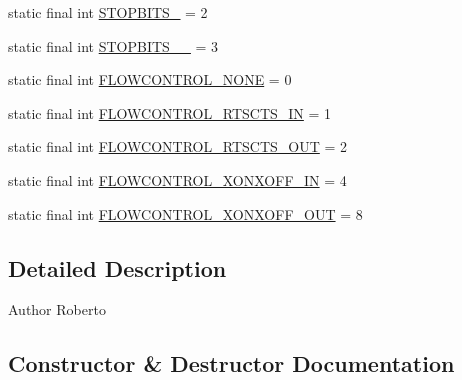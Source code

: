 \begin{DoxyCompactItemize}
\item 
static final int \hyperlink{classcom_1_1eneri_1_1scorpio__metertool_1_1ui_1_1_current_readings_records_a54572052540d5bf3f7bae7f11734f421}{S\+T\+O\+P\+B\+I\+T\+S\+\_} = 2
\item 
static final int \hyperlink{classcom_1_1eneri_1_1scorpio__metertool_1_1ui_1_1_current_readings_records_afaf278b563eae40768a7096641d89694}{S\+T\+O\+P\+B\+I\+T\+S\+\_\+\_} = 3
\item 
static final int \hyperlink{classcom_1_1eneri_1_1scorpio__metertool_1_1ui_1_1_current_readings_records_a6045158c6d6c073263331cf2dd9b59ba}{F\+L\+O\+W\+C\+O\+N\+T\+R\+O\+L\+\_\+\+N\+O\+NE} = 0
\item 
static final int \hyperlink{classcom_1_1eneri_1_1scorpio__metertool_1_1ui_1_1_current_readings_records_a67152ea3a495731f95e678b9a9addf8b}{F\+L\+O\+W\+C\+O\+N\+T\+R\+O\+L\+\_\+\+R\+T\+S\+C\+T\+S\+\_\+\+IN} = 1
\item 
static final int \hyperlink{classcom_1_1eneri_1_1scorpio__metertool_1_1ui_1_1_current_readings_records_a7e65b216afc0231edf3f66e3c17c5650}{F\+L\+O\+W\+C\+O\+N\+T\+R\+O\+L\+\_\+\+R\+T\+S\+C\+T\+S\+\_\+\+O\+UT} = 2
\item 
static final int \hyperlink{classcom_1_1eneri_1_1scorpio__metertool_1_1ui_1_1_current_readings_records_ae6668d5980371067c488de0ceae44a05}{F\+L\+O\+W\+C\+O\+N\+T\+R\+O\+L\+\_\+\+X\+O\+N\+X\+O\+F\+F\+\_\+\+IN} = 4
\item 
static final int \hyperlink{classcom_1_1eneri_1_1scorpio__metertool_1_1ui_1_1_current_readings_records_aa5171bc0cee0245bd2027d7b95b9df65}{F\+L\+O\+W\+C\+O\+N\+T\+R\+O\+L\+\_\+\+X\+O\+N\+X\+O\+F\+F\+\_\+\+O\+UT} = 8
\end{DoxyCompactItemize}


\subsection{Detailed Description}
\begin{DoxyAuthor}{Author}
Roberto 
\end{DoxyAuthor}


\subsection{Constructor \& Destructor Documentation}
\mbox{\label{classcom_1_1eneri_1_1scorpio__metertool_1_1ui_1_1_current_readings_records_a55868671df89636726603f01f0a3691a}} 
